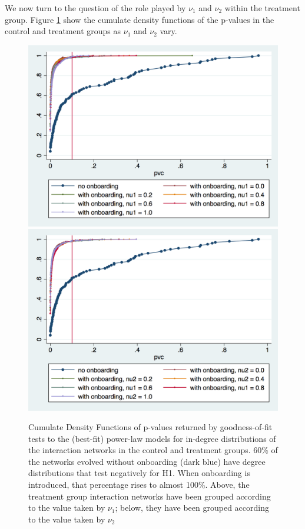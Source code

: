 \documentclass{article}
\begin{document}
We now turn to the question of the role played by $\nu_1$ and $\nu_2$ within the treatment group. Figure \ref{fig:CDFpvcnu_1nu_2} show the cumulate density functions of the p-values in the control and treatment groups as $\nu_1$ and $\nu_2$ vary. 

\begin{figure}[thb]
\centering

	\includegraphics[width=.75\linewidth]{./Pictures/CDF_pvc_nu1.png}\label{fig:CDFnu_1}
	\includegraphics[width=.75\linewidth]{./Pictures/CDF_pvc_nu2.png}\label{fig:CDFnu_2}
  \caption{Cumulate Density Functions of p-values returned by goodness-of-fit tests to the (best-fit) power-law models for in-degree distributions of the interaction networks in the control and treatment groups. 60\% of the networks evolved without onboarding (dark blue) have degree distributions that test negatively for H1. When onboarding is introduced, that percentage rises to almost 100\%. Above, the treatment group interaction networks have been grouped according to the value taken by $\nu_1$; below, they have been grouped according to the value taken by $\nu_2$ } 
 \label{fig:CDFpvcnu_1nu_2}
\end{figure}
\end{document}
